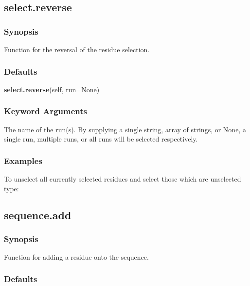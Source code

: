 


\newpage

\subsection{select.reverse}


\subsubsection{Synopsis}

Function for the reversal of the residue selection.

\subsubsection{Defaults}

\textsf{\textbf{select.reverse}(self, run=None)}


\subsubsection{Keyword Arguments}


  The name of the run(s).  By supplying a single string, array of strings, or None, a single run, multiple runs, or all runs will be selected respectively.

\subsubsection{Examples}

To unselect all currently selected residues and select those which are unselected type:




\newpage

\subsection{sequence.add}


\subsubsection{Synopsis}

Function for adding a residue onto the sequence.

\subsubsection{Defaults}

